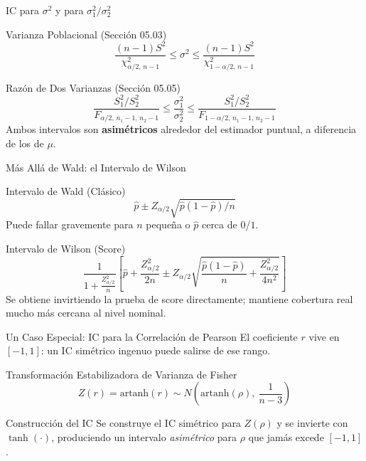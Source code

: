 \documentclass[10pt, aspectratio=169]{beamer}
\begin{document}
\begin{frame}{IC para $\sigma^2$ y para $\sigma_1^2/\sigma_2^2$}
  \footnotesize
  \begin{block}{Varianza Poblacional (Sección 05.03)}
    $$\frac{(n-1)S^2}{\chi^2_{\alpha/2,\,n-1}} \le \sigma^2 \le \frac{(n-1)S^2}{\chi^2_{1-\alpha/2,\,n-1}}$$
  \end{block}
  \pause

  \vspace{0.1cm}
  \begin{alertblock}{Razón de Dos Varianzas (Sección 05.05)}
    $$\frac{S_1^2/S_2^2}{F_{\alpha/2,\,n_1-1,\,n_2-1}} \le \frac{\sigma_1^2}{\sigma_2^2} \le \frac{S_1^2/S_2^2}{F_{1-\alpha/2,\,n_1-1,\,n_2-1}}$$
    Ambos intervalos son \textbf{asimétricos} alrededor del estimador puntual, a diferencia de los de $\mu$.
  \end{alertblock}
\end{frame}

\begin{frame}{Más Allá de Wald: el Intervalo de Wilson}
  \footnotesize
  \begin{block}{Intervalo de Wald (Clásico)}
    $$\hat p \pm Z_{\alpha/2}\sqrt{\hat p(1-\hat p)/n}$$
    Puede fallar gravemente para $n$ pequeña o $\hat p$ cerca de $0$/$1$.
  \end{block}
  \pause

  \vspace{0.1cm}
  \begin{alertblock}{Intervalo de Wilson (Score)}
    $$\frac{1}{1+\frac{Z_{\alpha/2}^2}{n}}\left[\hat p + \frac{Z_{\alpha/2}^2}{2n} \pm Z_{\alpha/2}\sqrt{\frac{\hat p(1-\hat p)}{n}+\frac{Z_{\alpha/2}^2}{4n^2}}\right]$$
    Se obtiene invirtiendo la prueba de score directamente; mantiene cobertura real mucho más cercana al nivel nominal.
  \end{alertblock}
\end{frame}

\begin{frame}{Un Caso Especial: IC para la Correlación de Pearson}
  \footnotesize
  El coeficiente $r$ vive en $[-1,1]$: un IC simétrico ingenuo puede salirse de ese rango. \pause

  \vspace{0.1cm}
  \begin{block}{Transformación Estabilizadora de Varianza de Fisher}
    $$Z(r) = \text{artanh}(r) \sim N\!\left(\text{artanh}(\rho),\ \frac{1}{n-3}\right)$$
  \end{block}

  \vspace{0.1cm}
  \pause
  \begin{alertblock}{Construcción del IC}
    Se construye el IC simétrico para $Z(\rho)$ y se invierte con $\tanh(\cdot)$, produciendo un intervalo \emph{asimétrico} para $\rho$ que jamás excede $[-1,1]$.
  \end{alertblock}
\end{frame}
\end{document}
